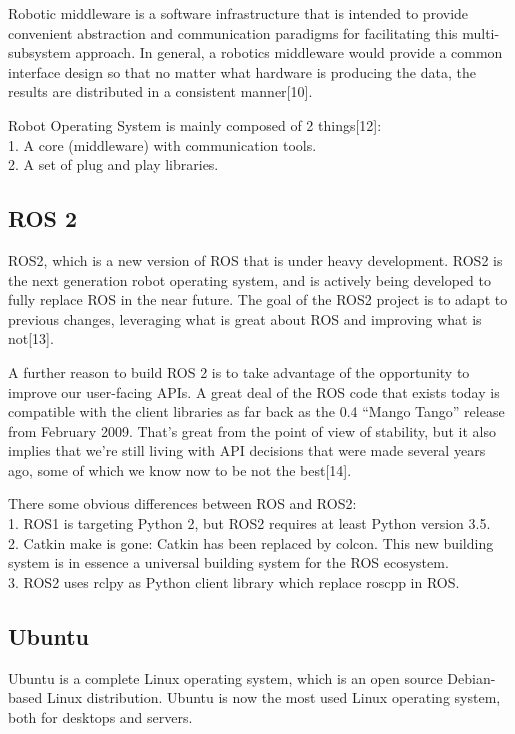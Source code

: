 \documentclass{mproj}
\begin{document}
Robotic middleware is a software infrastructure that is intended to provide convenient abstraction and communication paradigms for facilitating this multi-subsystem approach. In general, a robotics middleware would provide a common interface design so that no matter what hardware is producing the data, the results are distributed in a consistent manner[10].


Robot Operating System is mainly composed of 2 things[12]: \\
1. A core (middleware) with communication tools. \\
2. A set of plug and play libraries.

\subsection{ROS 2}
ROS2, which is a new version of ROS that is under heavy development. ROS2 is the next generation robot operating system, and is actively being developed to fully replace ROS in the near future. The goal of the ROS2 project is to adapt to previous changes, leveraging what is great about ROS and improving what is not[13]. 

A further reason to build ROS 2 is to take advantage of the opportunity to improve our user-facing APIs. A great deal of the ROS code that exists today is compatible with the client libraries as far back as the 0.4 “Mango Tango” release from February 2009. That’s great from the point of view of stability, but it also implies that we’re still living with API decisions that were made several years ago, some of which we know now to be not the best[14].

There some obvious differences between ROS and ROS2: \\
1. ROS1 is targeting Python 2, but ROS2 requires at least Python version 3.5. \\
2. Catkin make is gone: Catkin has been replaced by colcon. This new building system is in essence a universal building system for the ROS ecosystem. \\
3. ROS2 uses rclpy as Python client library which replace roscpp in ROS.

\subsection{Ubuntu}
Ubuntu is a complete Linux operating system, which is an open source Debian-based Linux distribution. Ubuntu is now the most used Linux operating system, both for desktops and servers.
\end{document}
